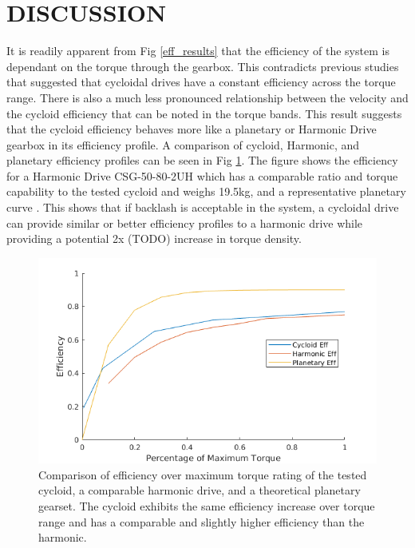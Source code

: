 \documentclass[letterpaper, 10 pt, conference]{ieeeconf}  %
\begin{document}
\section{DISCUSSION} \label{discussion}

It is readily apparent from Fig \ref{eff_results} that the efficiency of the system is dependant on the torque through the gearbox. This contradicts previous studies that suggested that cycloidal drives have a constant efficiency across the torque range. There is also a much less pronounced relationship between the velocity and the cycloid efficiency that can be noted in the torque bands. This result suggests that the cycloid efficiency behaves more like a planetary or Harmonic Drive gearbox in its efficiency profile. A comparison of cycloid, Harmonic, and planetary efficiency profiles can be seen in Fig \ref{eff_comp}. The figure shows the efficiency for a Harmonic Drive CSG-50-80-2UH \cite{harmonic_sheet} which has a comparable ratio and torque capability to the tested cycloid and weighs 19.5kg, and a representative planetary curve \cite{planetary}. This shows that if backlash is acceptable in the system, a cycloidal drive can provide similar or better efficiency profiles to a harmonic drive while providing a potential 2x (TODO) increase in torque density.

   \begin{figure}[!b]
      \centering
      \includegraphics[width=\linewidth]{eff_comp_v2}
      \caption{Comparison of efficiency over maximum torque rating of the tested cycloid, a comparable harmonic drive, and a theoretical planetary gearset. The cycloid exhibits the same efficiency increase over torque range and has a comparable and slightly higher efficiency than the harmonic.}
      \label{eff_comp}
   \end{figure}
   
\end{document}
